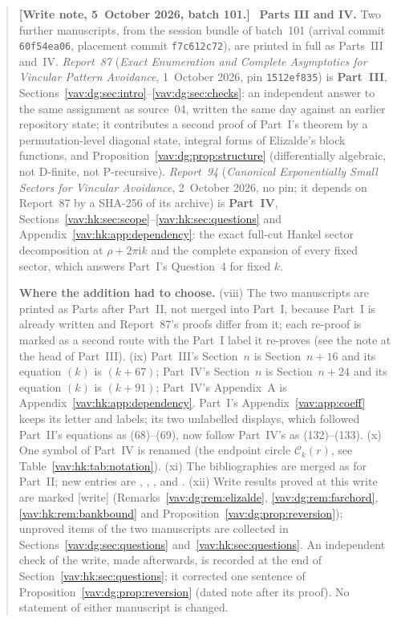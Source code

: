\documentclass[11pt]{article}
\theoremstyle{remark}\newtheorem{remark}[theorem]{Remark}
\newcommand{\ii}{\mathrm i}
\newenvironment{writenoteb}{\begin{quote}\small\raggedright\textbf{[Write note, 5~October 2026, batch 101.]}\ }{\end{quote}}
\begin{document}
\begin{writenoteb}
\textbf{Parts III and IV.} Two further manuscripts, from the session
bundle of batch~101 (arrival commit \texttt{60f54ea06}, placement commit
\texttt{f7c612c72}), are printed in full as Parts~III and~IV.
\emph{Report~87} (\emph{Exact Enumeration and Complete Asymptotics for
Vincular Pattern Avoidance}, 1~October 2026, pin \texttt{1512ef835}) is
\textbf{Part~III}, Sections~\ref{vav:dg:sec:intro}--\ref{vav:dg:sec:checks}:
an independent answer to the same assignment as source~04, written the same
day against an earlier repository state; it contributes a second proof of
Part~I's theorem by a permutation-level diagonal state, integral forms of
Elizalde's block functions, and Proposition~\ref{vav:dg:prop:structure}
(differentially algebraic, not D-finite, not P-recursive). \emph{Report~94}
(\emph{Canonical Exponentially Small Sectors for Vincular Avoidance},
2~October 2026, no pin; it depends on Report~87 by a SHA-256 of its
archive) is \textbf{Part~IV}, Sections~\ref{vav:hk:sec:scope}--\ref{vav:hk:sec:questions}
and Appendix~\ref{vav:hk:app:dependency}: the exact full-cut Hankel sector
decomposition at $\rho+2\pi\ii k$ and the complete expansion of every
fixed sector, which answers Part~I's Question~4 for fixed $k$.

\textbf{Where the addition had to choose.} (viii) The two manuscripts are
printed as Parts after Part~II, not merged into Part~I, because Part~I is
already written and Report~87's proofs differ from it; each re-proof is
marked as a second route with the Part~I label it re-proves (see the note
at the head of Part~III). (ix) Part~III's Section~$n$ is Section~$n+16$
and its equation $(k)$ is $(k+67)$; Part~IV's Section~$n$ is
Section~$n+24$ and its equation $(k)$ is $(k+91)$; Part~IV's Appendix~A is
Appendix~\ref{vav:hk:app:dependency}. Part~I's Appendix~\ref{vav:app:coeff}
keeps its letter and labels; its two unlabelled displays, which followed
Part~II's equations as (68)--(69), now follow Part~IV's as (132)--(133).
(x) One symbol of Part~IV is renamed (the endpoint circle
$\mathcal C_k(r)$, see Table~\ref{vav:hk:tab:notation}). (xi) The
bibliographies are merged as for Part~II; new entries are \cite{clark},
\cite{excedance}, \cite{fs}, \cite{proveitdg} and \cite{hkprior}.
(xii) Write results proved at this write are marked [write]
(Remarks~\ref{vav:dg:rem:elizalde}, \ref{vav:dg:rem:farchord},
\ref{vav:hk:rem:bankbound} and Proposition~\ref{vav:dg:prop:reversion});
unproved items of the two manuscripts are collected in
Sections~\ref{vav:dg:sec:questions} and~\ref{vav:hk:sec:questions}.
An independent check of the write, made afterwards, is recorded at the end
of Section~\ref{vav:hk:sec:questions}; it corrected one sentence of
Proposition~\ref{vav:dg:prop:reversion} (dated note after its proof).
No statement of either manuscript is changed.
\end{writenoteb}
\end{document}

